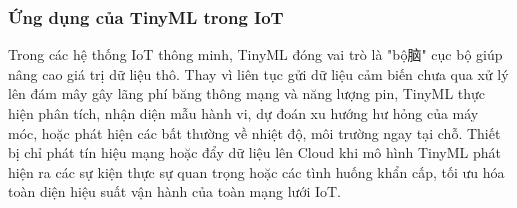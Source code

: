 \subsubsection{Ứng dụng của TinyML trong IoT}
Trong các hệ thống IoT thông minh, TinyML đóng vai trò là "bộ脑" cục bộ giúp nâng cao giá trị dữ liệu thô. Thay vì liên tục gửi dữ liệu cảm biến chưa qua xử lý lên đám mây gây lãng phí băng thông mạng và năng lượng pin, TinyML thực hiện phân tích, nhận diện mẫu hành vi, dự đoán xu hướng hư hỏng của máy móc, hoặc phát hiện các bất thường về nhiệt độ, môi trường ngay tại chỗ. Thiết bị chỉ phát tín hiệu mạng hoặc đẩy dữ liệu lên Cloud khi mô hình TinyML phát hiện ra các sự kiện thực sự quan trọng hoặc các tình huống khẩn cấp, tối ưu hóa toàn diện hiệu suất vận hành của toàn mạng lưới IoT.

